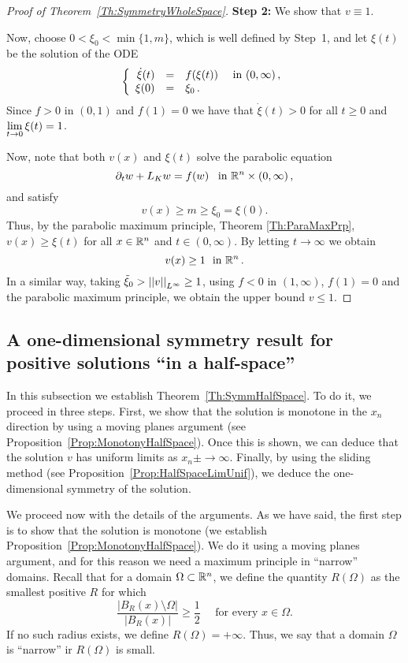 \begin{proof}[Proof of Theorem~\ref{Th:SymmetryWholeSpace}]
\textbf{Step 2:} We show that $v\equiv 1$.

Now, choose $0<\xi_0<\min\{1,m\}$, which is well defined by Step~1, and let $\xi(t)$ be the solution of the ODE
$$
\left\{\begin{array}{rcll}
\dot{\xi}(t) &=& f(\xi(t)) & \textrm{ in }(0,\infty)\,,\\
\xi(0) &=& \xi_0\,.
\end{array} \right.
$$
Since $f>0$ in $(0,1)$ and $f(1) = 0$ we have that $\dot{\xi}(t)>0$ for all $t\geq 0$ and $\displaystyle \lim_{t\to 0} \xi(t) = 1$.

Now, note that both $v(x)$ and $\xi(t)$ solve the parabolic equation
$$ \partial_t w + L_K w = f(w) \,\,\, \textrm{ in }\mathbb{R}^n\times (0,\infty)\,, $$
and satisfy
$$ v(x) \geq m \geq \xi_0 = \xi(0). $$
Thus, by the parabolic maximum principle, Theorem \ref{Th:ParaMaxPrp}, $v(x)\geq \xi(t)$ for all $x\in\mathbb{R}^n$ and $t\in(0,\infty)$. By letting $t \to \infty$ we obtain
$$ v(x) \geq 1 \,\, \textrm{ in }\mathbb{R}^n\,.  $$
In a similar way, taking $\tilde{\xi}_0>\left | \left |{v} \right | \right |_{L^\infty} \geq 1$, using $f<0$ in $(1,\infty)$, $f(1)=0$ and the parabolic maximum principle, we obtain the upper bound $v\leq 1$.

\end{proof}



\subsection{A one-dimensional symmetry result for positive solutions ``in a half-space''}

In this subsection we establish Theorem~\ref{Th:SymmHalfSpace}. To do it, we proceed in three steps. First, we show that the solution is monotone in the $x_n$ direction by using a moving planes argument (see Proposition~\ref{Prop:MonotonyHalfSpace}). Once this is shown, we can deduce that the solution $v$ has uniform limits as $x_n\pm\to \infty$. Finally, by using the sliding method (see Proposition~\ref{Prop:HalfSpaceLimUnif}), we deduce the one-dimensional symmetry of the solution.

We proceed now with the details of the arguments. As we have said, the first step is to show that the solution is monotone (we establish Proposition~\ref{Prop:MonotonyHalfSpace}). We do it using a moving planes argument, and for this reason we need a maximum principle in ``narrow'' domains. Recall that for a domain $\Omega \subset \mathbb{R}^n$, we define the quantity $R(\Omega)$ as the smallest positive $R$ for which
$$
\dfrac{|B_R(x)\setminus \Omega|}{|B_R(x)|}\geq \dfrac{1}{2} \quad \text{ for every } x \in \Omega.
$$
If no such radius exists, we define $R(\Omega) = +\infty$. Thus, we say that a domain $\Omega$ is ``narrow'' ir $R(\Omega)$ is small.


